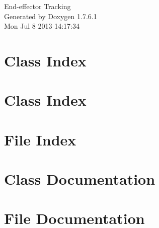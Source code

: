 \documentclass[a4paper]{book}
\begin{document}
\hypersetup{pageanchor=false,citecolor=blue}
\begin{titlepage}
\vspace*{7cm}
\begin{center}
{\Large \-End-\/effector \-Tracking }\\
\vspace*{1cm}
{\large \-Generated by Doxygen 1.7.6.1}\\
\vspace*{0.5cm}
{\small Mon Jul 8 2013 14:17:34}\\
\end{center}
\end{titlepage}
\clearemptydoublepage
{}
\tableofcontents
\clearemptydoublepage
{}
\hypersetup{pageanchor=true,citecolor=blue}
\chapter{\-Class \-Index}

\chapter{\-Class \-Index}

\chapter{\-File \-Index}

\chapter{\-Class \-Documentation}













\chapter{\-File \-Documentation}


















\printindex
\end{document}
